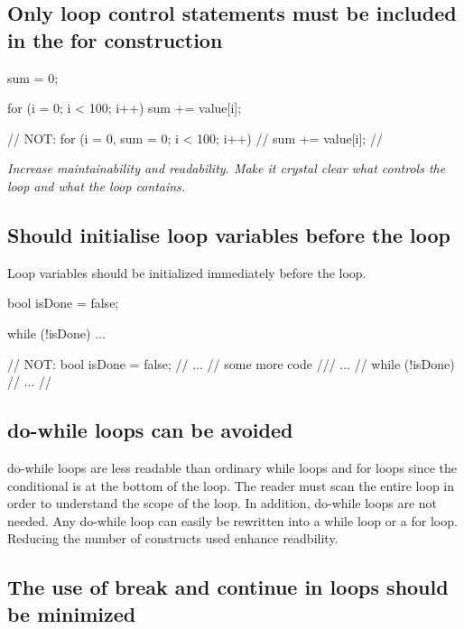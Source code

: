 \documentclass[a4paper,11pt,oneside]{scrbook}
\newcommand{\guideline}[1]{{\subsection{#1}}}
\newcommand{\motivation}[1]{{\normalfont \itshape #1}}
\newcommand{\trcode}[1]{{\normalfont \ttfamily #1}}
\begin{document}
\guideline{Only loop control statements must be included in the \trcode{for} construction}

\begin{code}
  sum = 0;

  for (i = 0; i < 100; i++) {
    sum += value[i];
  }

  // NOT: for (i = 0, sum = 0; i < 100; i++) {
  //        sum += value[i];
  //      }
\end{code}

\motivation{
  Increase maintainability and readability. Make it crystal clear what
  controls the loop and what the loop contains.
}

\guideline{Should initialise loop variables before the loop}

Loop variables should be initialized immediately before the loop.

\begin{code}
  bool isDone = false;

  while (!isDone) {
    ...
  }

  // NOT: bool isDone = false;
  //      ...
  //      some more code
  ///     ...
  //      while (!isDone) {
  //        ...
  //      } 
\end{code}

\guideline{\trcode{do-while} loops can be avoided}

do-while loops are less readable than ordinary while loops and for
loops since the conditional is at the bottom of the loop. The reader
must scan the entire loop in order to understand the scope of the
loop.  In addition, \trcode{do-while} loops are not needed. Any
\trcode{do-while} loop can easily be rewritten into a \trcode{while}
loop or a \trcode{for} loop. Reducing the number of constructs used
enhance readbility.

\guideline{The use of \trcode{break} and \trcode{continue} in loops should be minimized}
\end{document}
